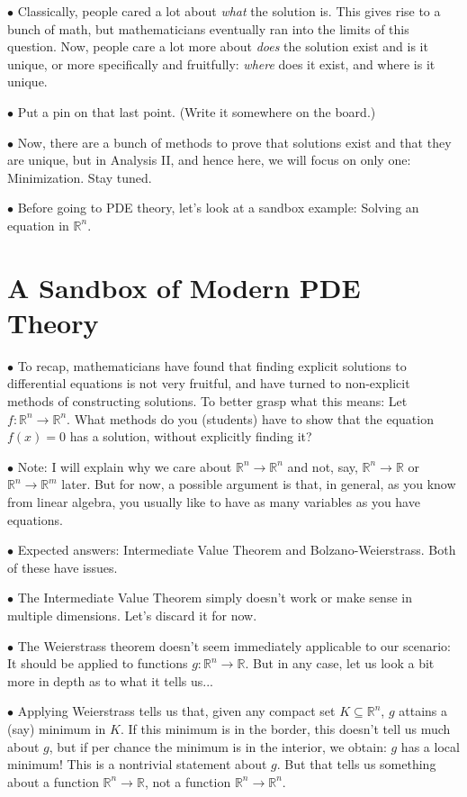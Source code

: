\documentclass{article}
\newcommand{\R}{\mathbb{R}}
\newcommand\point[1]{\noindent \hspace{\labelsep} $\bullet$ #1 \smallskip}
\begin{document}
\point{Classically, people cared a lot about \emph{what} the solution is. This gives rise to a bunch of math, but mathematicians eventually ran into the limits of this question. Now, people care a lot more about \emph{does} the solution exist and is it unique, or more specifically and fruitfully: \emph{where} does it exist, and where is it unique.}

\point{Put a pin on that last point. (Write it somewhere on the board.)}

\point{Now, there are a bunch of methods to prove that solutions exist and that they are unique, but in Analysis II, and hence here, we will focus on only one: Minimization. Stay tuned.}

\point{Before going to PDE theory, let's look at a sandbox example: Solving an equation in $\R^n$.}

\section{A Sandbox of Modern PDE Theory}

\point{To recap, mathematicians have found that finding explicit solutions to differential equations is not very fruitful, and have turned to non-explicit methods of constructing solutions. To better grasp what this means: Let $f \colon \R^n \to \R^n$. What methods do you (students) have to show that the equation $f(x) = 0$ has a solution, without explicitly finding it?}

\point{Note: I will explain why we care about $\R^n \to \R^n$ and not, say, $\R^n \to \R$ or $\R^n \to \R^m$ later. But for now, a possible argument is that, in general, as you know from linear algebra, you usually like to have as many variables as you have equations.}

\point{Expected answers: Intermediate Value Theorem and Bolzano-Weierstrass. Both of these have issues.}

\point{The Intermediate Value Theorem simply doesn't work or make sense in multiple dimensions. Let's discard it for now.}

\point{The Weierstrass theorem doesn't seem immediately applicable to our scenario: It should be applied to functions $g \colon \R^n \to \R$. But in any case, let us look a bit more in depth as to what it tells us...}

\point{Applying Weierstrass tells us that, given any compact set $K \subseteq \R^n$, $g$ attains a (say) minimum in $K$. If this minimum is in the border, this doesn't tell us much about $g$, but if per chance the minimum is in the interior, we obtain: $g$ has a local minimum! This is a nontrivial statement about $g$. But that tells us something about a function $\R^n \to \R$, not a function $\R^n \to \R^n$.}
\end{document}
